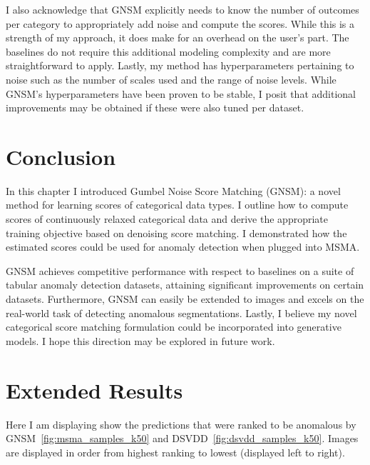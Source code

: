 I also acknowledge that GNSM explicitly needs to know the number of outcomes per category to appropriately add noise and compute the scores. While this is a strength of my approach, it does make for an overhead on the user's part. The baselines do not require this additional modeling complexity and are more straightforward to apply. Lastly, my method has hyperparameters pertaining to noise such as the number of scales used and the range of noise levels. While GNSM's hyperparameters have been proven to be stable, I posit that additional improvements may be obtained if these were also tuned per dataset.


\section{Conclusion}

In this chapter I introduced Gumbel Noise Score Matching (GNSM): a novel method for learning scores of categorical data types. I outline how to compute scores of continuously relaxed categorical data and derive the appropriate training objective based on denoising score matching. I demonstrated how the estimated scores could be used for anomaly detection when plugged into MSMA.

GNSM achieves competitive performance with respect to baselines on a suite of tabular anomaly detection datasets, attaining significant improvements on certain datasets. Furthermore, GNSM can easily be extended to images and excels on the real-world task of detecting anomalous segmentations. Lastly, I believe my novel categorical score matching formulation could be incorporated into generative models. I hope this direction may be explored in future work.

\section{Extended Results}\label{gnsm_ext_res}

Here I am displaying show the predictions that were ranked to be anomalous by GNSM~\ref{fig:msma_samples_k50} and DSVDD~\ref{fig:dsvdd_samples_k50}. Images are displayed in order from highest ranking to lowest (displayed left to right).

